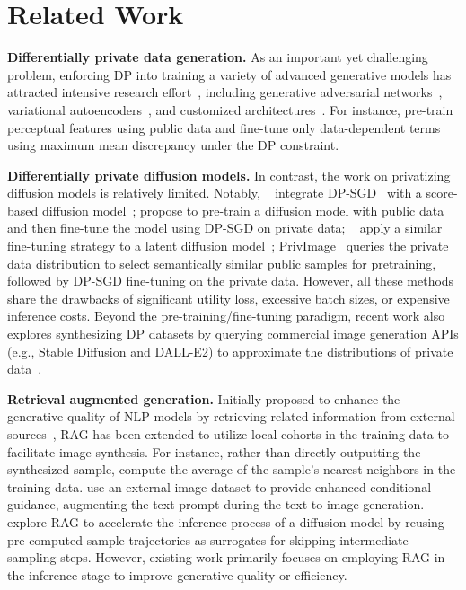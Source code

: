\section{Related Work}
{\bf Differentially private data generation.} As an important yet challenging problem, enforcing DP into training a variety of advanced generative models has attracted intensive research effort~\citep{sok}, including generative adversarial networks~\citep{gan,gs-wgan,pate-gan}, variational autoencoders~\citep{jiang2022dp2vae}, and customized architectures~\citep{liew2022pearl,vinaroz2022hermite,harder2021dpmerf}. For instance, \citet{harder2023pretrained} pre-train perceptual features using public data and fine-tune only data-dependent terms using maximum mean discrepancy under the DP constraint. 

{\bf Differentially private diffusion models.} In contrast, the work on privatizing diffusion models is relatively limited. Notably, \dpdm~\citep{dockhorn2022differentially} integrate DP-SGD~\citep{abadi2016deep} with a score-based diffusion model~\citep{song2021scorebased}; \citet{ghalebikesabi2023differentially} propose to pre-train a diffusion model with public data and then fine-tune the model using DP-SGD on private data; \dpldm~\citep{lyu2023differentially} apply a similar fine-tuning strategy to a latent diffusion model~\citep{rombach2022high}; PrivImage~\citep{privimage} queries the private data distribution to select semantically similar public samples for pretraining, followed by DP-SGD fine-tuning on the private data. However, all these methods share the drawbacks of significant utility loss, excessive batch sizes, or expensive inference costs. Beyond the pre-training/fine-tuning paradigm, recent work also explores synthesizing DP datasets by querying commercial image generation APIs (e.g., Stable Diffusion and DALL-E2) to approximate the distributions of private data~\citep{wangdp,dpsda}. 


{\bf Retrieval augmented generation.} Initially proposed to enhance the generative quality of NLP models by retrieving related information from external sources~\cite{khandelwal2019generalization,lewis2020retrieval,guu2020retrieval}, RAG has been extended to utilize local cohorts in the training data to facilitate image synthesis. For instance, rather than directly outputting the synthesized sample, \citet{casanova2021instance} compute the average of the sample's nearest neighbors in the training data. \citet{blattmann2022retrieval} use an external image dataset to provide enhanced conditional guidance, augmenting the text prompt during the text-to-image generation. \cite{zhang2023redi} explore RAG to accelerate the inference process of a diffusion model by reusing pre-computed sample trajectories as surrogates for skipping intermediate sampling steps. However, existing work primarily focuses on employing RAG in the inference stage to improve generative quality or efficiency.

